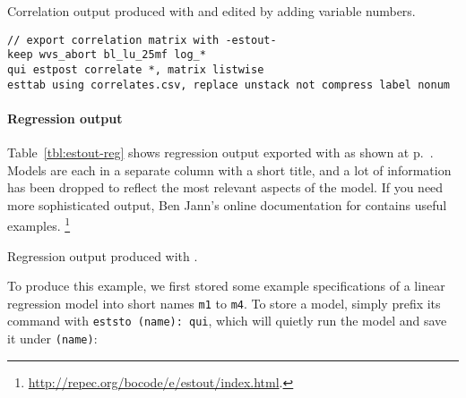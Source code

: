 
\begin{fullwidth}
	\begin{table}
		\footnotesize
    
		\caption{Correlation output produced with  and edited by adding variable numbers.}
		\label{tbl:estout-corr}
	\end{table}
\end{fullwidth}

\begin{verbatim}
// export correlation matrix with -estout-
keep wvs_abort bl_lu_25mf log_*
qui estpost correlate *, matrix listwise
esttab using correlates.csv, replace unstack not compress label nonum
\end{verbatim}

\paragraph{Regression output} Table~\ref{tbl:estout-reg} shows regression output exported with  as shown at p.~\pageref{tbl:hibbs_yx1_estout}. Models are each in a separate column with a short title, and a lot of information has been dropped to reflect the most relevant aspects of the model. If you need more sophisticated output, Ben Jann's online documentation for  contains useful examples.%
\footnote{\url{http://repec.org/bocode/e/estout/index.html}.}


\begin{fullwidth}
	\begin{table}
		\footnotesize
    
		\caption{Regression output produced with .}
		\label{tbl:estout-reg}
	\end{table}
\end{fullwidth}

To produce this example, we first stored some example specifications of a linear regression model into short names \texttt{m1} to \texttt{m4}. To store a model, simply prefix its command with \texttt{eststo (name): qui}, which will quietly run the model and save it under \texttt{(name)}:

